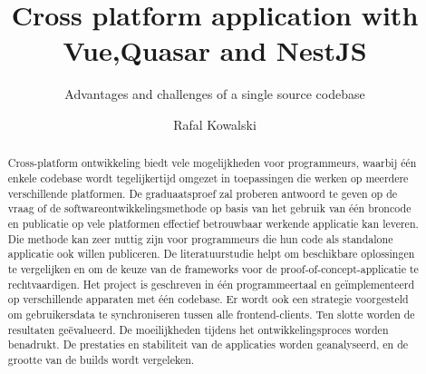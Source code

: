 \documentclass[a0,portrait]{hogent-poster}
\title{Cross platform application with Vue,\newline Quasar and NestJS}
\subtitle{Advantages and challenges of a single source codebase}
\author{Rafal Kowalski}
\begin{document}
\maketitle

\begin{abstract}

  Cross-platform ontwikkeling biedt vele mogelijkheden voor programmeurs, waarbij één enkele codebase wordt tegelijkertijd omgezet in toepassingen die werken op meerdere verschillende platformen. De graduaatsproef zal proberen antwoord te geven op de vraag of de softwareontwikkelingsmethode op basis van het gebruik van één broncode en publicatie op vele platformen effectief betrouwbaar werkende applicatie kan leveren. Die methode kan zeer nuttig zijn voor programmeurs die hun code als standalone applicatie ook willen publiceren. De literatuurstudie helpt om beschikbare oplossingen te vergelijken en om de keuze van de frameworks voor de proof-of-concept-applicatie te rechtvaardigen. \newline
  Het project is geschreven in één programmeertaal en geïmplementeerd op verschillende apparaten met één codebase. Er wordt ook een strategie voorgesteld om gebruikersdata te synchroniseren tussen alle frontend-clients.
  Ten slotte worden de resultaten geëvalueerd. De moeilijkheden tijdens het ontwikkelingsproces worden benadrukt. De prestaties en stabiliteit van de applicaties worden geanalyseerd, en de grootte van de builds wordt vergeleken.
\end{abstract}
\end{document}

